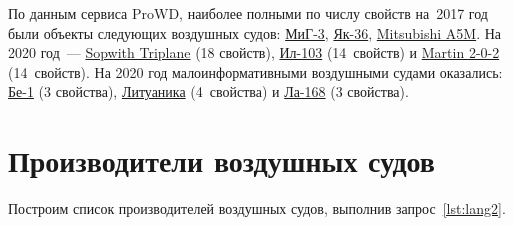 
По данным сервиса ProWD, 
наиболее полными по числу свойств 
на~2017 год были объекты следующих воздушных судов: 
\href{https://www.wikidata.org/wiki/Q271446}{МиГ-3}, 
\href{https://www.wikidata.org/wiki/Q1349098}{Як-36}, 
\href{https://www.wikidata.org/wiki/Q429839}{Mitsubishi A5M}. 
На 2020 год~--- \href{https://www.wikidata.org/wiki/Q770863}{Sopwith Triplane} (18 свойств), 
\href{https://www.wikidata.org/wiki/Q1658673}{Ил-103} (14~свойств) и 
\href{https://www.wikidata.org/wiki/Q665071}{Martin 2-0-2} (14~свойств).
%
На 2020 год малоинформативными воздушными судами оказались: 
\href{https://www.wikidata.org/wiki/Q820603}{Бе-1} (3 свойства), 
\href{https://www.wikidata.org/wiki/Q117984}{Литуаника} (4~свойства) и 
\href{https://www.wikidata.org/wiki/Q572762}{Ла-168} (3 свойства).



\section{Производители воздушных судов}%
\marginnote{\MarginQuestion У каких из представленных ниже российских производителей самолётов есть веб-сайты?%
\begin{itemize}
\item \ruwiki{vDw}{<<МиГ>>}
\item \ruwiki{vDx}{Саратовский авиационный завод}
\item \ruwiki{vDy}{<<Туполев>>}
\item \ruwiki{vDz}{<<Сухой>>}
\end{itemize}
См. ответ %
на с.~\pageref{answer:aircraft_manufacturers}.
}

Построим список производителей воздушных судов, выполнив запрос~\ref{lst:lang2}.

